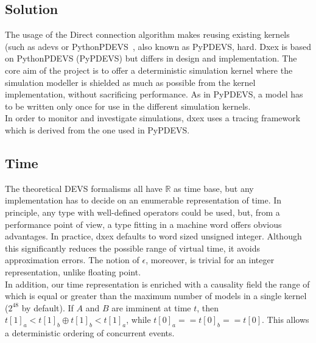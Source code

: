 \subsection{Solution} 
The usage of the Direct connection algorithm makes reusing existing kernels (such as adevs or PythonPDEVS~\cite{PythonPDEVS}, also known as PyPDEVS, hard. Dxex is based on PythonPDEVS \cite{PythonPDEVS}(PyPDEVS) but differs in design and implementation.
The core aim of the project is to offer a deterministic simulation kernel where the simulation modeller is shielded as much as possible from the kernel implementation, without sacrificing performance. As in PyPDEVS, a model has to be written only once for use in the different simulation kernels.\\
In order to monitor and investigate simulations, dxex uses a tracing framework which is derived from the one used in PyPDEVS.
\subsection{Time}
The theoretical DEVS formalisms all have $\mathbb{R}$ as time base, but any implementation has to decide on an enumerable representation of time. In principle, any type with well-defined operators could be used, but, from a performance point of view, a type fitting in a machine word offers obvious advantages. In practice, dxex defaults to word sized unsigned integer.
Although this significantly reduces the possible range of virtual time, it avoids approximation errors. The notion of $\epsilon$, moreover, is trivial for an integer representation, unlike floating point.\\
In addition, our time representation is enriched with a causality field the range of which is equal or greater than the maximum number of models in a single kernel ($2^{48}$ by default). If $A$ and $B$ are imminent at time $t$, then $t[1]_a < t[1]_b \oplus t[1]_b < t[1]_a$, while $t[0]_a == t[0]_b == t[0]$. This allows a deterministic ordering of concurrent events. %
